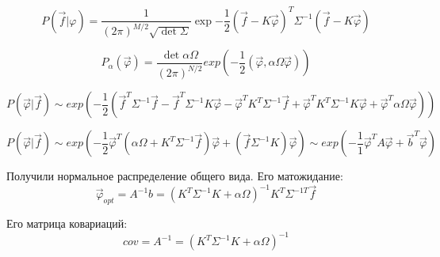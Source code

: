\documentclass{config}
\begin{document}
\begin{equation}
    P(\vec{f} | \varphi) = \frac{1}{(2\pi)^{M/2} \sqrt{\det{\Sigma}}}\exp{-\frac{1}{2}(\vec{f} - K \vec{\varphi})^T \Sigma^{-1} (\vec{f} - K \vec{\varphi})}
\end{equation}

\begin{equation}
    P_{\alpha}(\vec{\varphi}) = \frac{\det{\alpha \Omega}}{(2\pi)^{N/2}} exp(-\frac{1}{2} (\vec{\varphi}, \alpha \Omega \vec{\varphi}))
\end{equation}

\begin{equation}
    P(\vec{\varphi} | \vec{f}) \sim exp(-\frac{1}{2}(\vec{f}^T \Sigma^{-1} \vec{f} - \vec{f}^T \Sigma^{-1} K \vec{\varphi} -
\vec{\varphi}^T K^T \Sigma^{-1} \vec{f} + \vec{\varphi}^T K^T
\Sigma^{-1} K \vec{\varphi} + \vec{\varphi}^T \alpha \Omega
\vec{\varphi}))
\end{equation}

\begin{equation}
    P(\vec{\varphi} | \vec{f}) \sim exp(-\frac{1}{2}\vec{\varphi}^T(\alpha \Omega + K^T \Sigma^{-1} \vec{f})\vec{\varphi} + (\vec{f} \Sigma^{-1} K)\vec{\varphi}) \sim exp(-\frac{1}{1}\vec{\varphi}^T A \vec{\varphi} + \vec{b}^T \vec{\varphi})
\end{equation}

Получили нормальное распределение общего вида. Его матожидание:
\begin{equation}
    \vec{\varphi}_{opt} = A^{-1} b = (K^T \Sigma^{-1}K + \alpha \Omega)^{-1} K^T \Sigma^{-1T} \vec{f}
\end{equation}

Его матрица ковариаций:
\begin{equation}
    cov = A^{-1} = (K^T \Sigma^{-1} K + \alpha \Omega)^{-1}
\end{equation}
\end{document}
